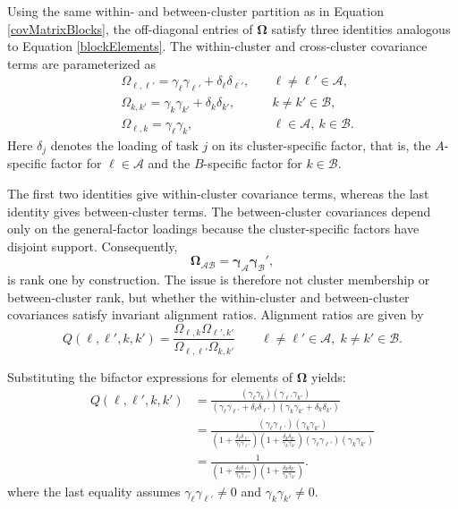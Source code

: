 \documentclass[
  american,
  man,floatsintext]{apa7}
\begin{document}
Using the same within- and between-cluster partition as in Equation \eqref{covMatrixBlocks}, the off-diagonal entries of \(\pmb\Omega\) satisfy three identities analogous to Equation \eqref{blockElements}. The within-cluster and cross-cluster covariance terms are parameterized as
\[
\begin{aligned}
&\Omega_{\ell,\ell'}  = \gamma_{\ell} \gamma_{\ell'} + \delta_{\ell} \delta_{\ell'} , &\quad \ell\neq\ell'\in\mathcal{A},\\
&\Omega_{k,k'}  = \gamma_{k} \gamma_{k'} + \delta_{k} \delta_{k'}, &\quad k \neq k'\in\mathcal{B},\\
&\Omega_{\ell,k}  = \gamma_{\ell} \gamma_{k}, &\quad \ell\in \mathcal{A},\ k\in \mathcal{B}.
\end{aligned}
\]
Here \(\delta_j\) denotes the loading of task \(j\) on its cluster-specific factor, that is, the \(A\)-specific factor for \(\ell\in\mathcal{A}\) and the \(B\)-specific factor for \(k\in\mathcal{B}\).

The first two identities give within-cluster covariance terms, whereas the last identity gives between-cluster terms. The between-cluster covariances depend only on the general-factor loadings because the cluster-specific factors have disjoint support. Consequently,
\[
\pmb\Omega_{\mathcal A\mathcal B}=\pmb\gamma_{\mathcal A}\pmb\gamma_{\mathcal B}',
\]
is rank one by construction. The issue is therefore not cluster membership or between-cluster rank, but whether the within-cluster and between-cluster covariances satisfy invariant alignment ratios. Alignment ratios are given by
\[
Q(\ell,\ell',k,k') = \frac{\Omega_{\ell,k}\Omega_{\ell',k'}}
{\Omega_{\ell,\ell'}\Omega_{k,k'}} \qquad \ell\ne \ell'\in \mathcal{A},\; k\neq k'\in \mathcal{B}.
\]

Substituting the bifactor expressions for elements of \(\pmb\Omega\) yields:
\[
\begin{aligned}
Q(\ell,\ell',k,k') & =
\frac{(\gamma_{\ell} \gamma_{k})(\gamma_{\ell'} \gamma_{k'})}
{(\gamma_{\ell} \gamma_{\ell'} + \delta_{\ell} \delta_{\ell'} )
(\gamma_{k} \gamma_{k'}+\delta_{k} \delta_{k'})} \\
&= \frac{(\gamma_{\ell} \gamma_{\ell'})(\gamma_{k} \gamma_{k'})}
{(1+\frac{\delta_{\ell} \delta_{\ell'}}{\gamma_{\ell} \gamma_{\ell'}})
(1+\frac{\delta_{k} \delta_{k'}}{\gamma_{k} \gamma_{k'}})
(\gamma_{\ell} \gamma_{\ell'})(\gamma_{k} \gamma_{k'})} \\
&= \frac{1}
{(1+\frac{\delta_{\ell} \delta_{\ell'}}{\gamma_{\ell} \gamma_{\ell'}})
(1+\frac{\delta_{k} \delta_{k'}}{\gamma_{k} \gamma_{k'}})}.
\end{aligned}
\]
where the last equality assumes \(\gamma_{\ell}\gamma_{\ell'}\neq 0\) and \(\gamma_{k}\gamma_{k'}\neq 0\).
\end{document}
